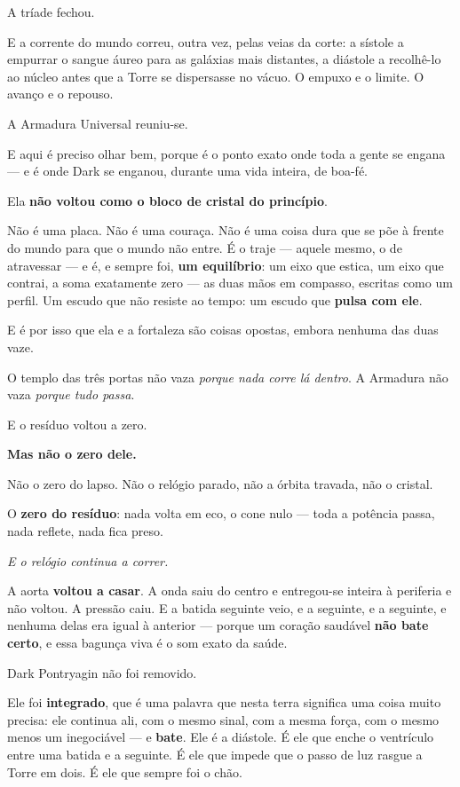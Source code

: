 \documentclass[livro.tex]{subfiles}
\begin{document}
A tríade fechou.

E a corrente do mundo correu, outra vez, pelas veias da corte: a sístole a empurrar o sangue áureo para as galáxias
mais distantes, a diástole a recolhê-lo ao núcleo antes que a Torre se dispersasse no vácuo. O empuxo e o limite. O
avanço e o repouso.

\medskip

A Armadura Universal reuniu-se.

E aqui é preciso olhar bem, porque é o ponto exato onde toda a gente se engana --- e é onde Dark se enganou, durante
uma vida inteira, de boa-fé.

Ela \textbf{não voltou como o bloco de cristal do princípio}.

Não é uma placa. Não é uma couraça. Não é uma coisa dura que se põe à frente do mundo para que o mundo não entre.
É o traje --- aquele mesmo, o de atravessar --- e é, e sempre foi, \textbf{um equilíbrio}: um eixo que estica, um eixo que contrai, a soma exatamente zero --- as duas
mãos em compasso, escritas como um perfil. Um escudo que não resiste ao tempo: um escudo que \textbf{pulsa com ele}.

E é por isso que ela e a fortaleza são coisas opostas, embora nenhuma das duas vaze.

O templo das três portas não vaza \emph{porque nada corre lá dentro}. A Armadura não vaza \emph{porque tudo passa}.

\medskip

E o resíduo voltou a zero.

\textbf{Mas não o zero dele.}

Não o zero do lapso. Não o relógio parado, não a órbita travada, não o cristal.

O \textbf{zero do resíduo}: nada volta em eco, o cone nulo --- toda a potência passa, nada reflete, nada
fica preso.

\emph{E o relógio continua a correr.}

A aorta \textbf{voltou a casar}. A onda saiu do centro e entregou-se inteira à periferia e não voltou. A pressão
caiu. E a batida seguinte veio, e a seguinte, e a seguinte, e nenhuma delas era igual à anterior --- porque um
coração saudável \textbf{não bate certo}, e essa bagunça viva é o som exato da saúde.

\medskip

Dark Pontryagin não foi removido.

Ele foi \textbf{integrado}, que é uma palavra que nesta terra significa uma coisa muito precisa: ele continua ali,
com o mesmo sinal, com a mesma força, com o mesmo menos um inegociável --- e \textbf{bate}. Ele é a diástole. É ele que
enche o ventrículo entre uma batida e a seguinte. É ele que impede que o passo de luz rasgue a Torre em dois. É ele
que sempre foi o chão.
\end{document}
